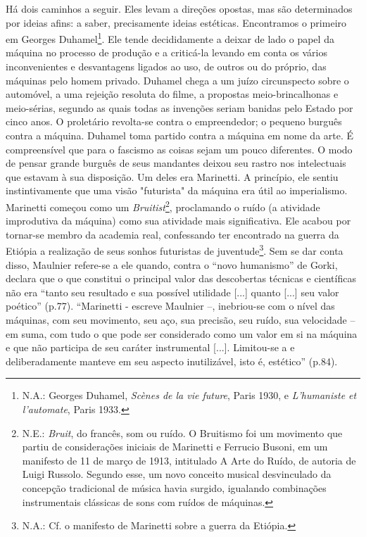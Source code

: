 Há dois caminhos a seguir. Eles levam a direções opostas, mas são
determinados por ideias afins: a saber, precisamente ideias estéticas.
Encontramos o primeiro em Georges Duhamel\footnote{N.A.: Georges
  Duhamel, \emph{Scènes de la vie future}, Paris 1930, e
  \emph{L'humaniste et l'automate}, Paris 1933.}. Ele tende
decididamente a deixar de lado o papel da máquina no processo de
produção e a criticá-la levando em conta os vários inconvenientes e
desvantagens ligados ao uso, de outros ou do próprio, das máquinas pelo
homem privado. Duhamel chega a um juízo circunspecto sobre o automóvel,
a uma rejeição resoluta do filme, a propostas meio-brincalhonas e
meio-sérias, segundo as quais todas as invenções seriam banidas pelo
Estado por cinco anos. O proletário revolta-se contra o empreendedor; o
pequeno burguês contra a máquina. Duhamel toma partido contra a máquina
em nome da arte. É compreensível que para o fascismo as coisas sejam um
pouco diferentes. O modo de pensar grande burguês de seus mandantes
deixou seu rastro nos intelectuais que estavam à sua disposição. Um
deles era Marinetti. A princípio, ele sentiu instintivamente que uma
visão "futurista" da máquina era útil ao imperialismo. Marinetti começou
como um \emph{Bruitist}\footnote{N.E.: \emph{Bruit}, do francês, som ou
  ruído. O Bruitismo foi um movimento que partiu de considerações
  iniciais de Marinetti e Ferrucio Busoni, em um manifesto de 11 de
  março de 1913, intitulado A Arte do Ruído, de autoria de Luigi
  Russolo. Segundo esse, um novo conceito musical desvinculado da
  concepção tradicional de música havia surgido, igualando combinações
  instrumentais clássicas de sons com ruídos de máquinas.}, proclamando
o ruído (a atividade improdutiva da máquina) como sua atividade mais
significativa. Ele acabou por tornar-se membro da academia real,
confessando ter encontrado na guerra da Etiópia a realização de seus
sonhos futuristas de juventude\footnote{N.A.: Cf. o manifesto de
  Marinetti sobre a guerra da Etiópia.}. Sem se dar conta disso,
Maulnier refere-se a ele quando, contra o ``novo humanismo'' de Gorki,
declara que o que constitui o principal valor das descobertas técnicas e
científicas não era ``tanto seu resultado e sua possível utilidade
{[}...{]} quanto {[}...{]} seu valor poético'' (p.77). ``Marinetti -
escreve Maulnier --, inebriou-se com o nível das máquinas, com seu
movimento, seu aço, sua precisão, seu ruído, sua velocidade -- em suma,
com tudo o que pode ser considerado como um valor em si na máquina e que
não participa de seu caráter instrumental {[}...{]}. Limitou-se a e
deliberadamente manteve em seu aspecto inutilizável, isto é, estético''
(p.84).

